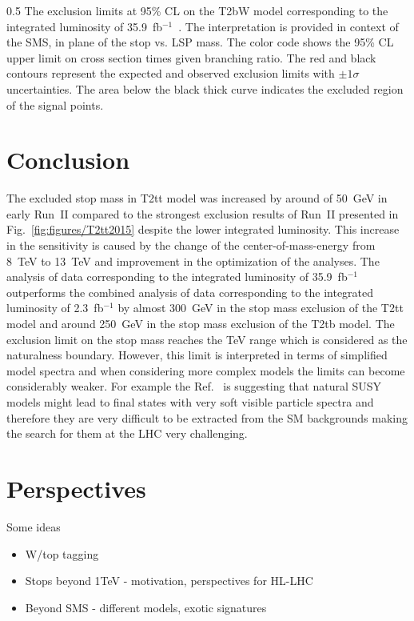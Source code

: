                  {0.5}       %
                 { The exclusion limits at 95\% CL on the T2bW model corresponding to the integrated luminosity of 35.9~fb$^{-1}$~\cite{Sirunyan:2017xse}. The interpretation is provided in context of the SMS, in plane of the stop vs. LSP mass. The color code shows the 95\% CL upper limit on cross section times given branching ratio. The red and black contours represent the expected and observed exclusion limits with $\pm 1 \sigma$ uncertainties. The area below the black thick curve indicates the excluded region of the signal points.  }

\section{Conclusion}

The excluded stop mass in T2tt model was increased by around of 50~GeV in early Run~II compared to the strongest exclusion results of Run~II presented in Fig.~\ref{fig:figures/T2tt2015} despite the lower integrated luminosity. This increase in the sensitivity is caused by the change of the center-of-mass-energy from 8~TeV to 13~TeV and improvement in the optimization of the analyses. The analysis of data corresponding to the integrated luminosity of 35.9~fb$^{-1}$ outperforms the combined analysis of data corresponding to the integrated luminosity of 2.3~fb$^{-1}$ by almost 300~GeV in the stop mass exclusion of the T2tt model and around 250~GeV in the stop mass exclusion of the T2tb model. The exclusion limit on the stop mass reaches the TeV range which is considered as the naturalness boundary. However, this limit is interpreted in terms of simplified model spectra and when considering more complex models the limits can become considerably weaker. For example the Ref.~\cite{Baer:2012uy} is suggesting that natural SUSY models might lead to final states with very soft visible particle spectra and therefore they are very difficult to be extracted from the SM backgrounds making the search for them at the LHC very challenging.



\section{Perspectives}

Some ideas

\begin{itemize}
\item W/top tagging
\item Stops beyond 1TeV  - motivation, perspectives for HL-LHC
\item Beyond SMS - different models, exotic signatures
\end{itemize}

